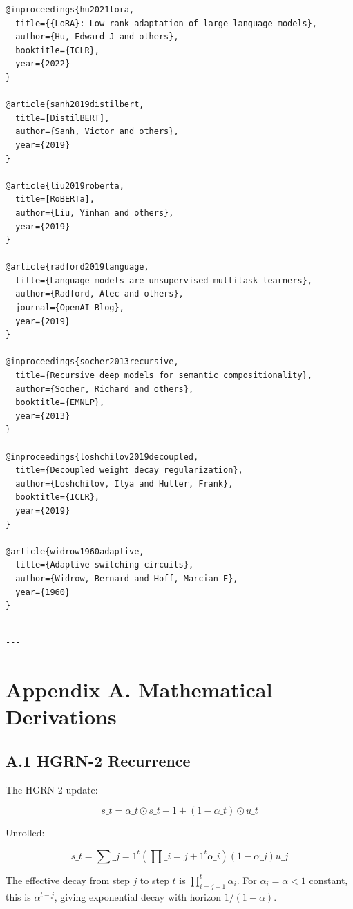 \begin{lstlisting}
@inproceedings{hu2021lora,
  title={{LoRA}: Low-rank adaptation of large language models},
  author={Hu, Edward J and others},
  booktitle={ICLR},
  year={2022}
}

@article{sanh2019distilbert,
  title=[DistilBERT],
  author={Sanh, Victor and others},
  year={2019}
}

@article{liu2019roberta,
  title=[RoBERTa],
  author={Liu, Yinhan and others},
  year={2019}
}

@article{radford2019language,
  title={Language models are unsupervised multitask learners},
  author={Radford, Alec and others},
  journal={OpenAI Blog},
  year={2019}
}

@inproceedings{socher2013recursive,
  title={Recursive deep models for semantic compositionality},
  author={Socher, Richard and others},
  booktitle={EMNLP},
  year={2013}
}

@inproceedings{loshchilov2019decoupled,
  title={Decoupled weight decay regularization},
  author={Loshchilov, Ilya and Hutter, Frank},
  booktitle={ICLR},
  year={2019}
}

@article{widrow1960adaptive,
  title={Adaptive switching circuits},
  author={Widrow, Bernard and Hoff, Marcian E},
  year={1960}
}
\end{lstlisting}
\begin{lstlisting}

---
\end{lstlisting}

\section{Appendix A. Mathematical Derivations}

\subsection{A.1 HGRN-2 Recurrence}

The HGRN-2 update:

\[
s\_t = \alpha\_t \odot s\_{t-1} + (1 - \alpha\_t) \odot u\_t
\tag{A.1}
\]

Unrolled:

\[
s\_t = \sum\_{j=1}^{t} \left( \prod\_{i=j+1}^{t} \alpha\_i \right) (1 - \alpha\_j) u\_j
\tag{A.2}
\]

The effective decay from step $j$ to step $t$ is $\prod_{i=j+1}^t \alpha_i$. 
For $\alpha_i = \alpha < 1$ constant, this is $\alpha^{t-j}$, giving 
exponential decay with horizon $1/(1-\alpha)$.

